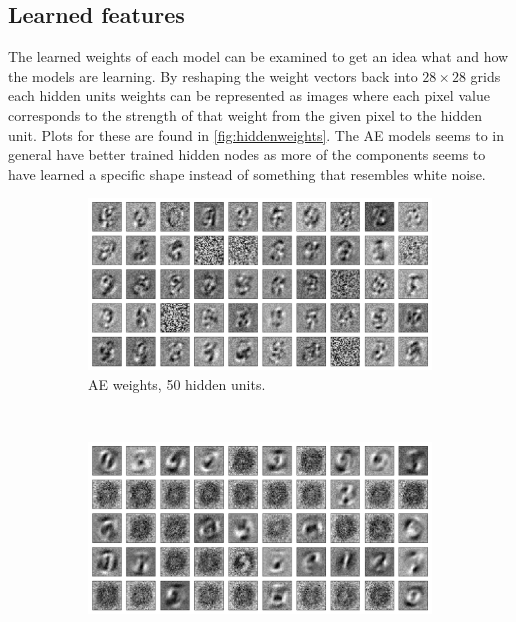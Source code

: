\documentclass{article}
\begin{document}
\subsection{Learned features}
The learned weights of each model can be examined to get an idea what and how the models are learning.
By reshaping the weight vectors back into $28 \times 28$ grids
each hidden units weights can be represented as images
where each pixel value corresponds to the strength of that weight from the given pixel to the hidden unit.
Plots for these are found in \cref{fig:hiddenweights}.
The AE models seems to in general have better trained hidden nodes
as more of the components seems to have learned a specific shape
instead of something that resembles white noise.

\begin{figure}[!ht]
  \centering
  \begin{subfigure}[t]{0.47\textwidth}
    \centering
    \includegraphics[width=\textwidth]{../plots/3_1_2/ae_last_layer_50_components.png}
    \caption{AE weights, 50 hidden units.}
    \label{fig:w50ae}
  \end{subfigure}
  ~
  \addtocounter{subfigure}{1}
  \begin{subfigure}[t]{0.47\textwidth}
    \centering
    \includegraphics[width=\textwidth]{../plots/3_1_2/rbm_last_layer_50_components.png}

\end{subfigure}
\end{figure}
\end{document}
